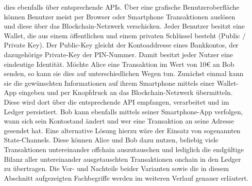 dies ebenfalls über entsprechende \ac{API}s. Über eine grafische Benutzeroberfläche können Benutzer meist per Browser oder Smartphone Transaktionen auslösen und diese über das Blockchain-Netzwerk verschicken. Jeder Benutzer besitzt eine Wallet, die aus einem öffentlichen und einem privaten Schlüssel besteht (Public / Private Key). Der Public-Key gleicht der Kontoaddresse eines Bankkontos, der dazugehörige Private-Key der PIN-Nummer. Damit besitzt jeder Nutzer eine eindeutige Identität. Möchte Alice eine Transaktion im Wert von 10€ an Bob senden, so kann sie dies auf unterschiedlichen Wegen tun. Zunächst einmal kann sie die gewünschten Informationen auf ihrem Smartphone mittels einer Wallet-App eingeben und per Knopfdruck an das Blockchain-Netzwerk übermitteln. Diese wird dort über die entsprechende \ac{API} empfangen, verarbeitet und im Ledger persistiert. Bob kann ebenfalls mittels seiner Smartphone-App verfolgen, wann sich sein Kontostand ändert und wer eine Transaktion an seine Adresse gesendet hat. Eine alternative Lösung hierzu wäre der Einsatz von sogenannten State-Channels. Diese können Alice und Bob dazu nutzen, beliebig viele Transaktionen untereinander offchain auszutauschen und lediglich die endgültige Bilanz aller untereinander ausgetauschten Transaktionen onchain in den Ledger zu übertragen. Die Vor- und Nachteile beider Varianten sowie die in diesem Abschnitt aufgezeigten Fachbegriffe werden im weiteren Verlauf genauer erläutert.



